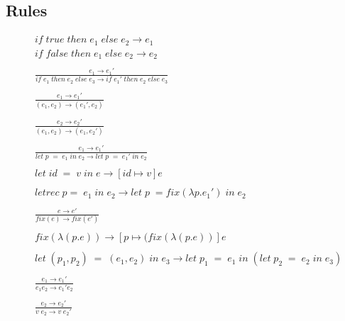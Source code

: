 \documentclass[10pt,a4paper,draft]{article}
\begin{document}
\begin{flushleft}
\subsection{Rules}
\begin{align*}
\tag{E-IfTrue}
&if \; true  \; then \; e_{1} \; else \; e_{2} \rightarrow e_{1}\\
\tag{E-IfFalse}
&if \; false \; then \; e_{1} \; else \; e_{2} \rightarrow e_{2}\\ \\
\tag{E-IfThenElse}
&\frac{e_{1} \rightarrow e_{1}'}
{if \; e_{1} \; then \; e_{2} \; else \; e_{3} \rightarrow if \; e_{1}' \; then \; e_{2} \; else \; e_{3}}\\ \\
\tag{E-PairLeft}
&\frac{e_{1} \rightarrow e_{1}'}
{(e_{1},e_{2}) \rightarrow (e_{1}',e_{2})} \\ \\
\tag{E-PairRight}
&\frac{e_{2} \rightarrow e_{2}'}
{(e_{1},e_{2}) \rightarrow (e_{1},e_{2}')} \\ \\
\tag{E-Let}
&\frac{e_{1}\rightarrow e_{1}'}
{let \; p \; = \; e_{1} \; in \; e_{2} \rightarrow let \; p \; = \; e_{1}' \; in \; e_{2}}
\\ \\
\tag{E-LetV}
&let \; id \; = \; v \; in \; e \rightarrow [id \mapsto v]e \\ \\
\tag{E-LetRec}
& letrec\;p=\;e_{1} \; in \; e_{2} \rightarrow let \; p \; = fix(\lambda p.e_{1}') \; in \; e_{2} \\ \\ 
\tag{E-Fix}
&\frac{e\rightarrow e'}
{fix(e) \rightarrow fix(e')}\\ \\
\tag{E-FixRec}
&fix(\lambda(p.e)) \rightarrow [p \mapsto (fix (\lambda(p.e))]e \\
\\
\tag{E-PatternMatch}
&let \; (p_{1},p_{2}) \; = \; (e_{1},e_{2}) \; in \; e_{3} \rightarrow
let \; p_{1} \; = \; e_{1} \; in \;
(let \; p_{2}  \; = \; e_{2} \; in \; e_{3}) \\ \\
\tag{E-App1}
&\frac{e_{1} \rightarrow e_{1}'}
{e_{1} e_{2} \rightarrow e_{1}' e_{2}}\\ \\
\tag{E-App2}
&\frac{e_{2} \rightarrow e_{2}'}
{v\;e_{2} \rightarrow v\;e_{2}'}\\ \\

\end{align*}
\end{flushleft}
\end{document}

